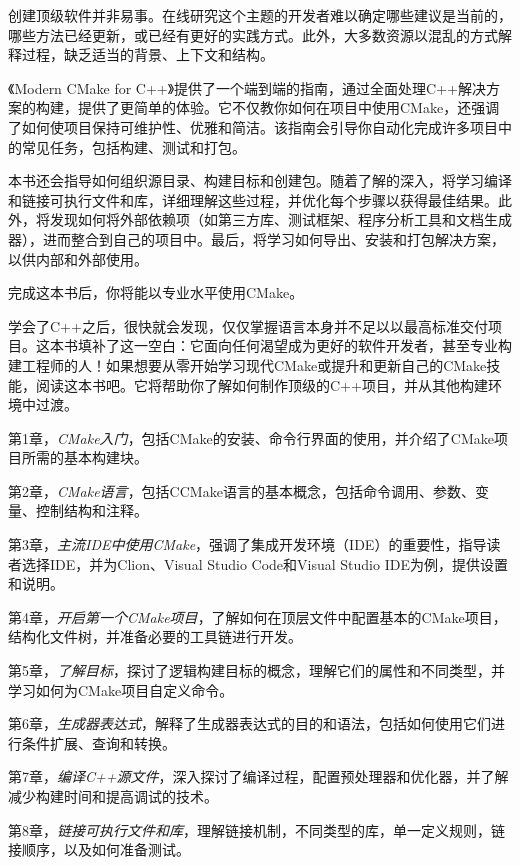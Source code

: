 


创建顶级软件并非易事。在线研究这个主题的开发者难以确定哪些建议是当前的，哪些方法已经更新，或已经有更好的实践方式。此外，大多数资源以混乱的方式解释过程，缺乏适当的背景、上下文和结构。

《Modern CMake for C++》提供了一个端到端的指南，通过全面处理C++解决方案的构建，提供了更简单的体验。它不仅教你如何在项目中使用CMake，还强调了如何使项目保持可维护性、优雅和简洁。该指南会引导你自动化完成许多项目中的常见任务，包括构建、测试和打包。

本书还会指导如何组织源目录、构建目标和创建包。随着了解的深入，将学习编译和链接可执行文件和库，详细理解这些过程，并优化每个步骤以获得最佳结果。此外，将发现如何将外部依赖项（如第三方库、测试框架、程序分析工具和文档生成器），进而整合到自己的项目中。最后，将学习如何导出、安装和打包解决方案，以供内部和外部使用。

完成这本书后，你将能以专业水平使用CMake。


学会了C++之后，很快就会发现，仅仅掌握语言本身并不足以以最高标准交付项目。这本书填补了这一空白：它面向任何渴望成为更好的软件开发者，甚至专业构建工程师的人！如果想要从零开始学习现代CMake或提升和更新自己的CMake技能，阅读这本书吧。它将帮助你了解如何制作顶级的C++项目，并从其他构建环境中过渡。


第1章，\textit{CMake入门}，包括CMake的安装、命令行界面的使用，并介绍了CMake项目所需的基本构建块。

第2章，\textit{CMake语言}，包括CCMake语言的基本概念，包括命令调用、参数、变量、控制结构和注释。

第3章，\textit{主流IDE中使用CMake}，强调了集成开发环境（IDE）的重要性，指导读者选择IDE，并为Clion、Visual Studio Code和Visual Studio IDE为例，提供设置和说明。

第4章，\textit{开启第一个CMake项目}，了解如何在顶层文件中配置基本的CMake项目，结构化文件树，并准备必要的工具链进行开发。

第5章，\textit{了解目标}，探讨了逻辑构建目标的概念，理解它们的属性和不同类型，并学习如何为CMake项目自定义命令。

第6章，\textit{生成器表达式}，解释了生成器表达式的目的和语法，包括如何使用它们进行条件扩展、查询和转换。

第7章，\textit{编译C++源文件}，深入探讨了编译过程，配置预处理器和优化器，并了解减少构建时间和提高调试的技术。

第8章，\textit{链接可执行文件和库}，理解链接机制，不同类型的库，单一定义规则，链接顺序，以及如何准备测试。

